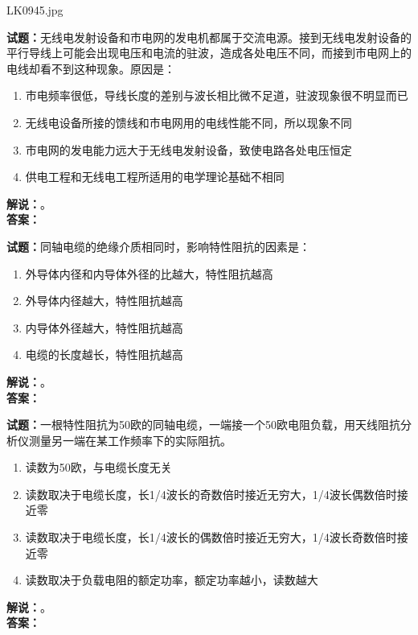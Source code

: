 \documentclass{ctexbook}
\begin{document}
\vspace{\baselineskip}

LK0945.jpg

\noindent\textbf{试题：}无线电发射设备和市电网的发电机都属于交流电源。接到无线电发射设备的平行导线上可能会出现电压和电流的驻波，造成各处电压不同，而接到市电网上的电线却看不到这种现象。原因是：
\begin{enumerate}[leftmargin=3em]
  \item 市电频率很低，导线长度的差别与波长相比微不足道，驻波现象很不明显而已
  \item 无线电设备所接的馈线和市电网用的电线性能不同，所以现象不同
  \item 市电网的发电能力远大于无线电发射设备，致使电路各处电压恒定
  \item 供电工程和无线电工程所适用的电学理论基础不相同
\end{enumerate}
\noindent\textbf{解说：}\textbf{}。\\\noindent\textbf{答案：}

\vspace{\baselineskip}

\noindent\textbf{试题：}同轴电缆的绝缘介质相同时，影响特性阻抗的因素是：
\begin{enumerate}[leftmargin=3em]
  \item 外导体内径和内导体外径的比越大，特性阻抗越高
  \item 外导体内径越大，特性阻抗越高
  \item 内导体外径越大，特性阻抗越高
  \item 电缆的长度越长，特性阻抗越高
\end{enumerate}
\noindent\textbf{解说：}\textbf{}。\\\noindent\textbf{答案：}

\vspace{\baselineskip}

\noindent\textbf{试题：}一根特性阻抗为50欧的同轴电缆，一端接一个50欧电阻负载，用天线阻抗分析仪测量另一端在某工作频率下的实际阻抗。
\begin{enumerate}[leftmargin=3em]
  \item 读数为50欧，与电缆长度无关
  \item 读数取决于电缆长度，长1/4波长的奇数倍时接近无穷大，1/4波长偶数倍时接近零
  \item 读数取决于电缆长度，长1/4波长的偶数倍时接近无穷大，1/4波长奇数倍时接近零
  \item 读数取决于负载电阻的额定功率，额定功率越小，读数越大
\end{enumerate}
\noindent\textbf{解说：}\textbf{}。\\\noindent\textbf{答案：}
\end{document}
